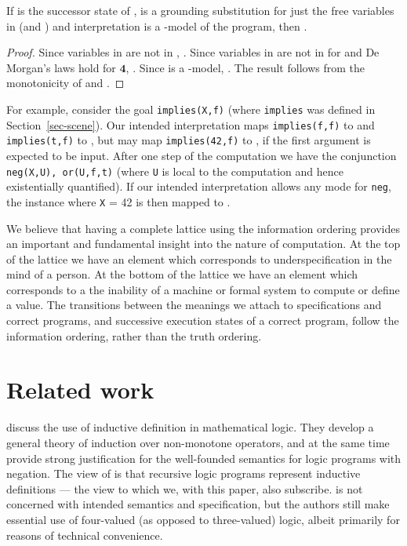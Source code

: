 \documentclass{tlp}
\newcommand{\Quad}{\ensuremath{\mathbf{4}}}
\begin{document}
\pagebreak
\begin{proposition}
\label{prop-comp-order}
If  is the successor state of ,  is a grounding
substitution for just the free variables in  (and ) and
interpretation  is a -model of the program,
then .
\end{proposition}
\begin{proof}
Since variables in  are not in , .
Since variables in  are not in  for 
and De Morgan's laws hold for \Quad, .
Since  is a -model, .
The result follows from the monotonicity of  and .
\end{proof}
For example, consider the goal \texttt{implies(X,f)}
(where \verb!implies! was defined in Section~\ref{sec-scene}). 
Our intended interpretation maps
\texttt{implies(f,f)} to  and \texttt{implies(t,f)} to
, but may map \texttt{implies(42,f)} to , if the
first argument is expected to be input.  After one step of the computation
we have the conjunction \texttt{neg(X,U), or(U,f,t)}
(where \texttt{U} is local to the computation and hence existentially
quantified).
If our intended interpretation allows any mode for \texttt{neg}, the
instance where \texttt{X} = 42 is then mapped to .

We believe that having a complete lattice using the information
ordering provides an important and fundamental insight into the nature
of computation.  At the top of the lattice we have an element which
corresponds to underspecification in the mind of a person.  At the
bottom of the lattice we have an element which corresponds to a the
inability of a machine or formal system to compute or define a value.
The transitions between the meanings we attach to specifications and
correct programs, and successive execution states of a correct program,
follow the information ordering, rather than the truth ordering.

\section{Related work}
\label{sec-related}

 discuss
the use of inductive definition in mathematical logic.
They develop a general theory of induction over non-monotone
operators, and at the same time provide strong justification for
the well-founded semantics \cite{VanGelder91,Fitting:JLP93}
for logic programs with negation.
The view of  is that recursive logic
programs represent inductive definitions --- the view to which we,
with this paper, also subscribe.
 is not concerned with intended
semantics and specification, but the authors still make essential 
use of four-valued (as opposed to three-valued) logic, 
albeit primarily for reasons of technical convenience.
\end{document}

